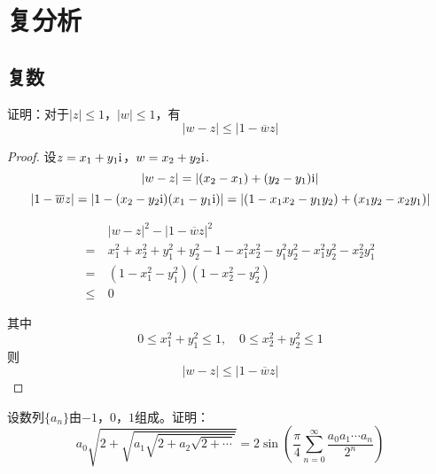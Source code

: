 \chapter{复分析}

\section{复数}

\begin{proposition}
    
    证明：对于$|z| \leq 1$，$|w| \leq 1$，有
    $$|w - z| \leq |1 - \overline{w}z|$$

\end{proposition}

\begin{proof}

    设$z = x_1 + y_1\mathrm{i}$，$w = x_2 + y_2\mathrm{i}$.
    $$|w - z| = | (x_2 - x_1) + (y_2 - y_1)\mathrm{i}| $$
    $$|1 - \overline{w}z| = |1 - (x_2 - y_2\mathrm{i}) (x_1 - y_1\mathrm{i})| = | (1 - x_1x_2 - y_1y_2) + (x_1y_2 - x_2y_1) |$$

    \begin{align*}
        &|w - z|^2 - |1 - \overline{w}z|^2 \\
        = \ & x_1^2 + x_2^2 + y_1^2 + y_2^2 - 1 - x_1^2x_2^2 -  y_1^2y_2^2 - x_1^2 y_2^2 -  x_2^2y_1^2 \\
        = \ & (1 - x_1^2 - y_1^2) (1 - x_2^2 - y_2^2) \\
        \leq \ & 0
    \end{align*}

    其中
    $$0 \leq x_1^2 + y_1^2 \leq 1, \quad 0 \leq x_2^2 + y_2^2 \leq 1$$
    则
    $$|w - z| \leq |1 - \overline{w}z|$$

\end{proof}

\begin{proposition}

    设数列$\{a_n\}$由$-1$，$0$，$1$组成。证明：
    $$a_0\sqrt{2 + \sqrt{a_1 \sqrt{2 + a_2\sqrt{2 + \cdots}}}} = 2 \sin{\left( \dfrac{\pi}{4} \sum\limits_{n = 0}^{\infty}{\dfrac{a_0 a_1 \cdots a_n}{2^n}} \right)}$$

\end{proposition}

